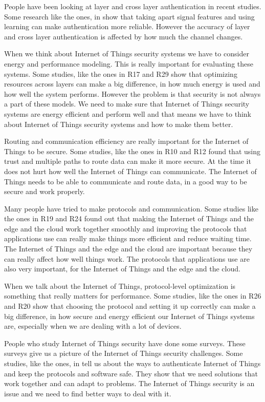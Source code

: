 \documentclass[a4paper,fleqn]{cas-dc}
\numberwithin{equation}{section}
\begin{document}
People have been looking at layer and cross layer authentication in recent studies. Some research like the ones, in \cite{martalo2024crosslayer3} show that taking apart signal features and using learning can make authentication more reliable. However the accuracy of layer and cross layer authentication is affected by how much the channel changes.

When we think about Internet of Things security systems we have to consider energy and performance modeling. This is really important for evaluating these systems. Some studies, like the ones in R17 and R29 show that optimizing resources across layers can make a big difference, in how much energy is used and how well the system performs. However the problem is that security is not always a part of these models. We need to make sure that Internet of Things security systems are energy efficient and perform well and that means we have to think about Internet of Things security systems and how to make them better.

Routing and communication efficiency are really important for the Internet of Things to be secure. Some studies, like the ones in R10 and R12 found that using trust and multiple paths to route data can make it more secure. At the time it does not hurt how well the Internet of Things can communicate. The Internet of Things needs to be able to communicate and route data, in a good way to be secure and work properly.

Many people have tried to make protocols and communication. Some studies like the ones in R19 and R24 found out that making the Internet of Things and the edge and the cloud work together smoothly and improving the protocols that applications use can really make things more efficient and reduce waiting time. The Internet of Things and the edge and the cloud are important because they can really affect how well things work. The protocols that applications use are also very important, for the Internet of Things and the edge and the cloud.

When we talk about the Internet of Things, protocol-level optimization is something that really matters for performance. Some studies, like the ones in R26 and R20 show that choosing the protocol and setting it up correctly can make a big difference, in how secure and energy efficient our Internet of Things systems are, especially when we are dealing with a lot of devices.

People who study Internet of Things security have done some surveys. These surveys give us a picture of the Internet of Things security challenges. Some studies, like the ones, in \cite{hu2024physec} tell us about the ways to authenticate Internet of Things and keep the protocols and software safe. They show that we need solutions that work together and can adapt to problems. The Internet of Things security is an issue and we need to find better ways to deal with it.
\end{document}
